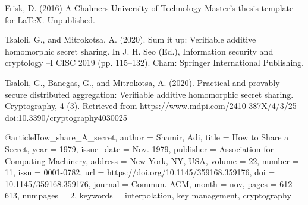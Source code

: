 \begin{thebibliography}{69}

 Frisk, D. (2016) A Chalmers University of Technology Master's thesis template for \LaTeX . Unpublished.

 Tsaloli, G., and Mitrokotsa, A. (2020). Sum it up:  Verifiable additive homomorphic secret  sharing. In  J.  H.  Seo  (Ed.), Information  security  and  cryptology  –I CISC 2019 (pp. 115–132). Cham:  Springer International Publishing.

 Tsaloli, G., Banegas, G., and Mitrokotsa, A. (2020). Practical   and provably   secure   distributed aggregation: Verifiable   additive   homomorphic secret sharing. Cryptography, 4 (3). Retrieved from https://www.mdpi.com/2410-387X/4/3/25 doi:10.3390/cryptography4030025 

@article{How_share_A_secret,
author = {Shamir, Adi},
title = {How to Share a Secret},
year = {1979},
issue_date = {Nov. 1979},
publisher = {Association for Computing Machinery},
address = {New York, NY, USA},
volume = {22},
number = {11},
issn = {0001-0782},
url = {https://doi.org/10.1145/359168.359176},
doi = {10.1145/359168.359176},
journal = {Commun. ACM},
month = nov,
pages = {612–613},
numpages = {2}, 
keywords = {interpolation, key management, cryptography} }

\end{thebibliography}
